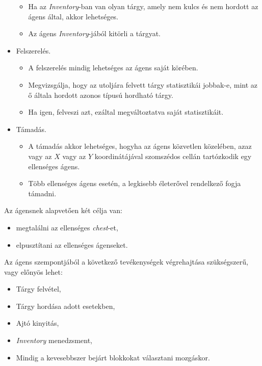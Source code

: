 \begin{itemize}
    \begin{itemize}
        \item Ha az \textit{Inventory}-ban van olyan tárgy, amely nem kulcs és nem hordott az ágens által, akkor lehetséges.
        \item Az ágens \textit{Inventory}-jából kitörli a tárgyat.
    \end{itemize}

    \item Felszerelés. 
    
    \begin{itemize}
        \item A felszerelés mindig lehetséges az ágens saját körében.
        \item Megvizsgálja, hogy az utoljára felvett tárgy statisztikái jobbak-e, mint az ő általa hordott azonos típusú hordható tárgy.
        \item Ha igen, felveszi azt, ezáltal megváltoztatva saját statisztikáit.
    \end{itemize}

    \item Támadás. 
    
    \begin{itemize}
        \item A támadás akkor lehetséges, hogyha az ágens közvetlen közelében, azaz vagy az $X$ vagy az $Y$ koordinátájával szomszédos cellán tartózkodik egy ellenséges ágens.
        \item Több ellenséges ágens esetén, a legkisebb életerővel rendelkező fogja támadni.
    \end{itemize}

\end{itemize}


Az ágensnek alapvetően két célja van:
\begin{itemize}
    \item megtalálni az ellenséges \textit{chest}-et,
    \item elpusztítani az ellenséges ágenseket.
\end{itemize}


Az ágens szempontjából a következő tevékenységek végrehajtása szükségszerű, vagy előnyös lehet:
\begin{itemize}
    \item Tárgy felvétel,
    \item Tárgy hordása adott esetekben,
    \item Ajtó kinyitás,
    \item \textit{Inventory} menedzsment,
    \item Mindig a kevesebbszer bejárt blokkokat választani mozgáskor.
\end{itemize}

